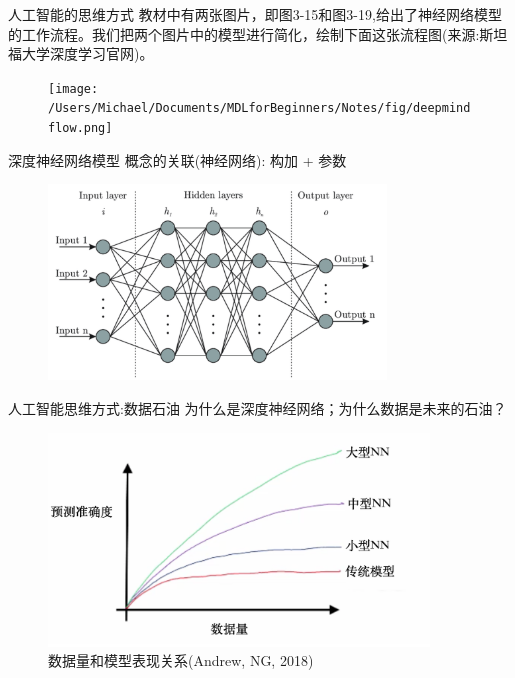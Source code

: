 \documentclass[handout]{beamer}
\begin{document}
\begin{frame}{人工智能的思维方式}
教材中有两张图片，即图3-15和图3-19,给出了神经网络模型的工作流程。我们把两个图片中的模型进行简化，绘制下面这张流程图(来源:斯坦福大学深度学习官网)。
\begin{figure}[H]
	\centering
	\texttt{[image: /Users/Michael/Documents/MDLforBeginners/Notes/fig/deepmindflow.png]}
\end{figure}
\end{frame}

\begin{frame}{深度神经网络模型}
	概念的关联(神经网络): 构加 + 参数
	\begin{figure}[H]
		\centering
		\includegraphics[width=0.8\textwidth]{fig/StdNN}
	\end{figure}
\end{frame}

\begin{frame}{人工智能思维方式:数据石油}
	为什么是深度神经网络；为什么数据是未来的石油？
	\begin{figure}[H]
		\centering
		\includegraphics[width=0.9\textwidth]{fig/dataoil}
		\caption{数据量和模型表现关系(Andrew, NG, 2018)}
	\end{figure}
\end{frame}
\end{document}
